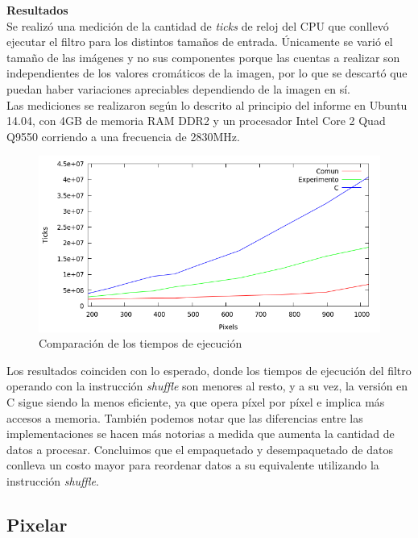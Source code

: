 \documentclass[a4paper]{article}
\begin{document}
\textbf{Resultados}
\\Se realizó una medición de la cantidad de \textit{ticks} de reloj del CPU que conllevó ejecutar el filtro para los distintos tamaños de entrada. Únicamente se varió el tamaño de las imágenes y no sus componentes porque las cuentas a realizar son independientes de los valores cromáticos de la imagen, por lo que se descartó que puedan haber variaciones apreciables dependiendo de la imagen en sí.
\\Las mediciones se realizaron según lo descrito al principio del informe en Ubuntu 14.04, con 4GB de memoria RAM DDR2 y un procesador Intel Core 2 Quad Q9550 corriendo a una frecuencia de 2830MHz.\\

\begin{figure}[H]
  \begin{center}
	\includegraphics[scale=0.77]{imagenes/rotarExp.png}
	\caption{Comparación de los tiempos de ejecución}
	\label{rotar_exp}
  \end{center}
\end{figure}

Los resultados coinciden con lo esperado, donde los tiempos de ejecución del filtro operando con la instrucción \textit{shuffle} son menores al resto, y a su vez, la versión en C sigue siendo la menos eficiente, ya que opera píxel por píxel e implica más accesos a memoria. También podemos notar que las diferencias entre las implementaciones se hacen más notorias a medida que aumenta la cantidad de datos a procesar. Concluimos que el empaquetado y desempaquetado de datos conlleva un costo mayor para reordenar datos a su equivalente utilizando la instrucción \textit{shuffle}.

\newpage

\subsection{Pixelar}
\end{document}
